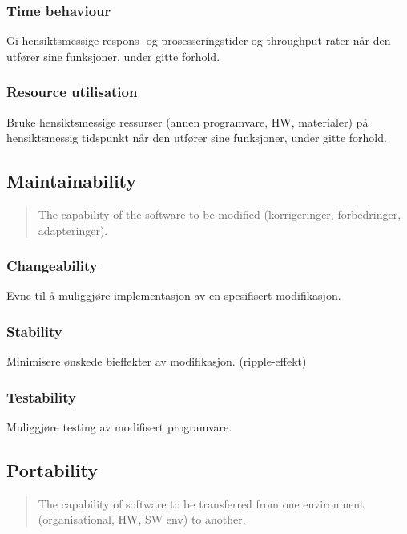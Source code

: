 \subsubsection{Time behaviour}

Gi hensiktsmessige respons- og prosesseringstider og throughput-rater
når den utfører sine funksjoner, under gitte forhold.

\subsubsection{Resource utilisation}

Bruke hensiktsmessige ressurser (annen programvare, HW, materialer) på
hensiktsmessig tidspunkt når den utfører sine funksjoner, under gitte
forhold.

\subsection{Maintainability}

\begin{quote}
The capability of the software to be modified (korrigeringer,
forbedringer, adapteringer).

\end{quote}
\subsubsection{Changeability}

Evne til å muliggjøre implementasjon av en spesifisert modifikasjon.

\subsubsection{Stability}

Minimisere ønskede bieffekter av modifikasjon. (ripple-effekt)

\subsubsection{Testability}

Muliggjøre testing av modifisert programvare.

\subsection{Portability}

\begin{quote}
The capability of software to be transferred from one environment
(organisational, HW, SW env) to another.

\end{quote}
